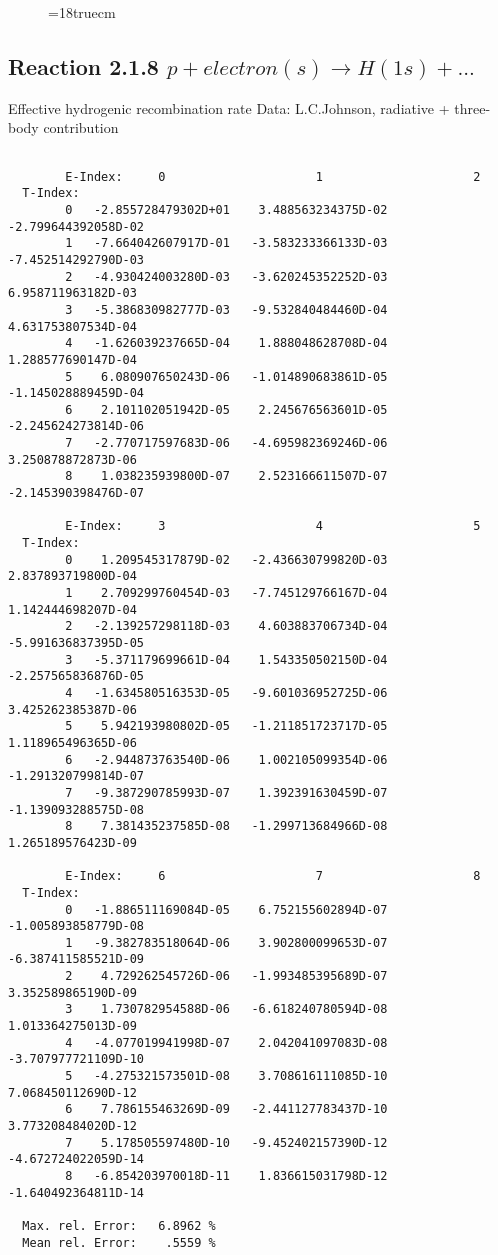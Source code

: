 \begin{figure} \label{2.1.5FU}
\epsfxsize=18truecm
\end{figure}
\newpage


\subsection{
  Reaction 2.1.8  $ p + electron(s) \rightarrow H(1s) + ...$
}

   Effective hydrogenic recombination rate
   Data: L.C.Johnson, radiative + three-body contribution


\begin{verbatim}

        E-Index:     0                     1                     2
  T-Index:
        0   -2.855728479302D+01    3.488563234375D-02   -2.799644392058D-02
        1   -7.664042607917D-01   -3.583233366133D-03   -7.452514292790D-03
        2   -4.930424003280D-03   -3.620245352252D-03    6.958711963182D-03
        3   -5.386830982777D-03   -9.532840484460D-04    4.631753807534D-04
        4   -1.626039237665D-04    1.888048628708D-04    1.288577690147D-04
        5    6.080907650243D-06   -1.014890683861D-05   -1.145028889459D-04
        6    2.101102051942D-05    2.245676563601D-05   -2.245624273814D-06
        7   -2.770717597683D-06   -4.695982369246D-06    3.250878872873D-06
        8    1.038235939800D-07    2.523166611507D-07   -2.145390398476D-07

        E-Index:     3                     4                     5
  T-Index:
        0    1.209545317879D-02   -2.436630799820D-03    2.837893719800D-04
        1    2.709299760454D-03   -7.745129766167D-04    1.142444698207D-04
        2   -2.139257298118D-03    4.603883706734D-04   -5.991636837395D-05
        3   -5.371179699661D-04    1.543350502150D-04   -2.257565836876D-05
        4   -1.634580516353D-05   -9.601036952725D-06    3.425262385387D-06
        5    5.942193980802D-05   -1.211851723717D-05    1.118965496365D-06
        6   -2.944873763540D-06    1.002105099354D-06   -1.291320799814D-07
        7   -9.387290785993D-07    1.392391630459D-07   -1.139093288575D-08
        8    7.381435237585D-08   -1.299713684966D-08    1.265189576423D-09

        E-Index:     6                     7                     8
  T-Index:
        0   -1.886511169084D-05    6.752155602894D-07   -1.005893858779D-08
        1   -9.382783518064D-06    3.902800099653D-07   -6.387411585521D-09
        2    4.729262545726D-06   -1.993485395689D-07    3.352589865190D-09
        3    1.730782954588D-06   -6.618240780594D-08    1.013364275013D-09
        4   -4.077019941998D-07    2.042041097083D-08   -3.707977721109D-10
        5   -4.275321573501D-08    3.708616111085D-10    7.068450112690D-12
        6    7.786155463269D-09   -2.441127783437D-10    3.773208484020D-12
        7    5.178505597480D-10   -9.452402157390D-12   -4.672724022059D-14
        8   -6.854203970018D-11    1.836615031798D-12   -1.640492364811D-14

  Max. rel. Error:   6.8962 %
  Mean rel. Error:    .5559 %


\end{verbatim}
